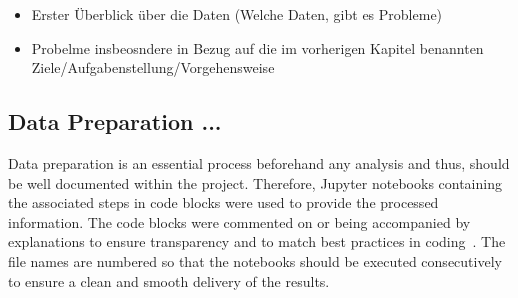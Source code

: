 \begin{itemize}
    \item Erster Überblick über die Daten (Welche Daten, gibt es Probleme)
    \item Probelme insbeosndere in Bezug auf die im vorherigen Kapitel benannten Ziele/Aufgabenstellung/Vorgehensweise
\end{itemize}

\subsection{Data Preparation ...}\label{subsec:datapreparation}
Data preparation is an essential process beforehand any analysis and thus, should be well documented within the project.
Therefore, Jupyter notebooks containing the associated steps in code blocks were used to provide the processed information.
The code blocks were commented on or being accompanied by explanations to ensure transparency and to match best practices in coding~\autocite[cf.][]{Kosourova.2021}.
The file names are numbered so that the notebooks should be executed consecutively to ensure a clean and smooth delivery of the results.

